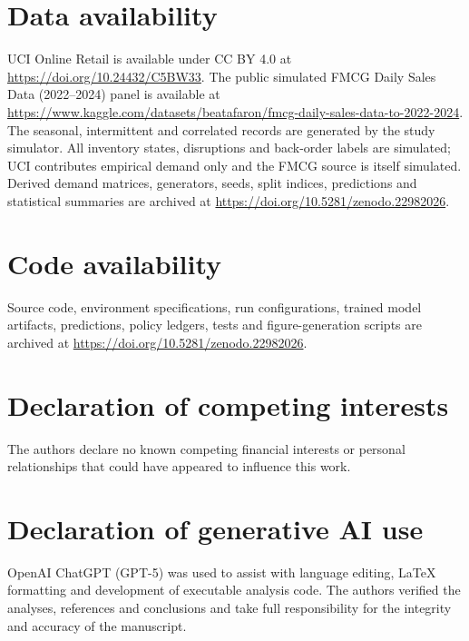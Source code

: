 \documentclass[11pt,a4paper]{article}
\begin{document}
\section*{Data availability}
UCI Online Retail is available under CC BY 4.0 at \url{https://doi.org/10.24432/C5BW33}. The public simulated FMCG Daily Sales Data (2022--2024) panel is available at \url{https://www.kaggle.com/datasets/beatafaron/fmcg-daily-sales-data-to-2022-2024}. The seasonal, intermittent and correlated records are generated by the study simulator. All inventory states, disruptions and back-order labels are simulated; UCI contributes empirical demand only and the FMCG source is itself simulated. Derived demand matrices, generators, seeds, split indices, predictions and statistical summaries are archived at \url{https://doi.org/10.5281/zenodo.22982026}.
\section*{Code availability}
Source code, environment specifications, run configurations, trained model artifacts, predictions, policy ledgers, tests and figure-generation scripts are archived at \url{https://doi.org/10.5281/zenodo.22982026}.
\section*{Declaration of competing interests}The authors declare no known competing financial interests or personal relationships that could have appeared to influence this work.
\section*{Declaration of generative AI use}OpenAI ChatGPT (GPT-5) was used to assist with language editing, LaTeX formatting and development of executable analysis code. The authors verified the analyses, references and conclusions and take full responsibility for the integrity and accuracy of the manuscript.
\end{document}

